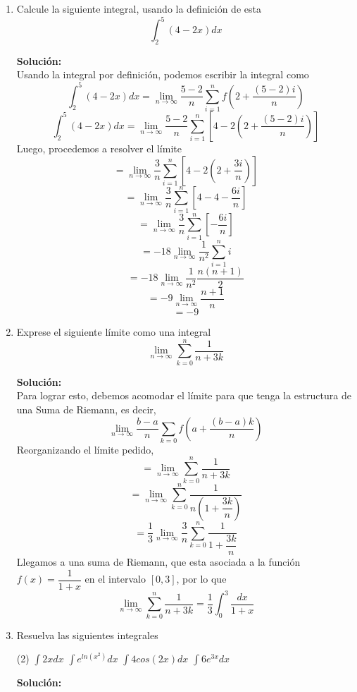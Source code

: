 \documentclass[12pt]{article}
\newenvironment{solucion}
{\begin{mdframed}[backgroundcolor=black!10]
		{\bf Solución:}\\
	}
	{
	\end{mdframed}
}
\newenvironment{preguntas}
{\begin{enumerate}\itemsep12pt
	}
	{
	\end{enumerate}
}
\newcommand{\ra}{\rightarrow}
\begin{document}
\begin{preguntas}
\item Calcule la siguiente integral, usando la definición de esta
	$$\int_2^5(4-2x)dx$$
\begin{solucion}
Usando la integral por definición, podemos escribir la integral como
		$$\int_2^5(4-2x)dx = \lim\limits_{n\ra \infty} \dfrac{5-2}{n} \sum\limits_{i=1}^n f \left(2+\dfrac{(5-2)i}{n}\right) $$
		$$\int_2^5(4-2x)dx = \lim\limits_{n\ra \infty} \dfrac{5-2}{n} \sum\limits_{i=1}^n \left[4-2 \left(2+\dfrac{(5-2)i}{n}\right)\right]$$
		Luego, procedemos a resolver el límite
		$$= \lim\limits_{n\ra \infty} \dfrac{3}{n} \sum\limits_{i=1}^n \left[4-2 \left(2+\dfrac{3i}{n}\right)\right]$$
		$$= \lim\limits_{n\ra \infty} \dfrac{3}{n} \sum\limits_{i=1}^n \left[4-4-\dfrac{6i}{n}\right]$$
		$$= \lim\limits_{n\ra \infty} \dfrac{3}{n} \sum\limits_{i=1}^n \left[-\dfrac{6i}{n}\right]$$
		$$= -18\lim\limits_{n\ra \infty} \dfrac{1}{n^2} \sum\limits_{i=1}^n i$$
		$$= -18\lim\limits_{n\ra \infty} \dfrac{1}{n^2} \dfrac{n(n+1)}{2}$$
		$$= -9\lim\limits_{n\ra \infty} \dfrac{n+1}{n}$$
		$$= -9$$
\end{solucion}
\item Exprese el siguiente límite como una integral
	$$\lim\limits_{n\ra \infty} \sum\limits_{k=0}^n \dfrac{1}{n+3k}$$
\begin{solucion}
Para lograr esto, debemos acomodar el límite para que tenga la estructura de una Suma de Riemann, es decir,
		$$\lim\limits_{n \ra \infty} \dfrac{b-a}{n}\sum\limits_{k=0} f\left(a+\dfrac{(b-a)k}{n}\right)$$
		Reorganizando el límite pedido,
		$$ = \lim\limits_{n\ra \infty} \sum\limits_{k=0}^n \dfrac{1}{n+3k}$$
		$$ = \lim\limits_{n\ra \infty} \sum\limits_{k=0}^n \dfrac{1}{n\left(1+\dfrac{3k}{n}\right)}$$
		$$ = \dfrac{1}{3} \lim\limits_{n\ra \infty} \dfrac{3}{n} \sum\limits_{k=0}^n \dfrac{1}{1+\dfrac{3k}{n}}$$
		Llegamos a una suma de Riemann, que esta asociada a la función $f(x) = \dfrac{1}{1+x}$ en el intervalo $[0, 3]$, por lo que
		$$\lim\limits_{n\ra \infty} \sum\limits_{k=0}^n \dfrac{1}{n+3k} = \dfrac{1}{3} \displaystyle\int_0^3 \dfrac{dx}{1+x}$$
\end{solucion}
\item Resuelva las siguientes integrales
\begin{tasks}(2)
\task $\displaystyle\int 2xdx$
\task $\displaystyle\int e^{ln(x^2)}dx$
\task $\displaystyle\int 4cos(2x)dx$
\task $\displaystyle\int 6e^{3x}dx$
\end{tasks}
\begin{solucion}


\end{solucion}
\end{preguntas}
\end{document}

